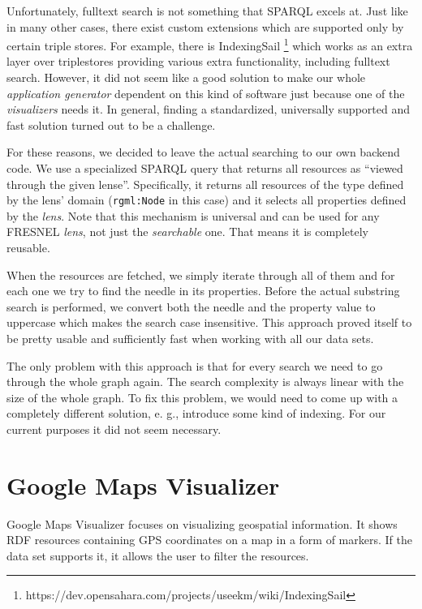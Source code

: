 Unfortunately, fulltext search is not something that SPARQL excels at. Just like in many other cases, there exist custom extensions which are supported only by certain triple stores. For example, there is IndexingSail \footnote{https://dev.opensahara.com/projects/useekm/wiki/IndexingSail} which works as an extra layer over triplestores providing various extra functionality, including fulltext search. However, it did not seem like a good solution to make our whole \emph{application generator} dependent on this kind of software just because one of the \emph{visualizers} needs it.  In general, finding a standardized, universally supported and fast solution turned out to be a challenge.

For these reasons, we decided to leave the actual searching to our own backend code. We use a specialized SPARQL query that returns all resources as “viewed through the given lense”. Specifically, it returns all resources of the type defined by the lens’ domain (\texttt{rgml:Node} in this case) and it selects all properties defined by the \emph{lens}. Note that this mechanism is universal and can be used for any FRESNEL \emph{lens}, not just the \emph{searchable} one. That means it is completely reusable.

When the resources are fetched, we simply iterate through all of them and for each one we try to find the needle in its properties. Before the actual substring search is performed, we convert both the needle and the property value to uppercase which makes the search case insensitive. This approach proved itself to be pretty usable and sufficiently fast when working with all our data sets.

The only problem with this approach is that for every search we need to go through the whole graph again. The search complexity is always linear with the size of the whole graph. To fix this problem, we would need to come up with a completely different solution, e. g., introduce some kind of indexing. For our current purposes it did not seem necessary.

\section{Google Maps Visualizer}
\label{sec:visualizers:google-maps}
%
%
%
Google Maps Visualizer focuses on visualizing geospatial information. It shows RDF resources containing GPS coordinates on a map in a form of markers. If the data set supports it, it allows the user to filter the resources.


